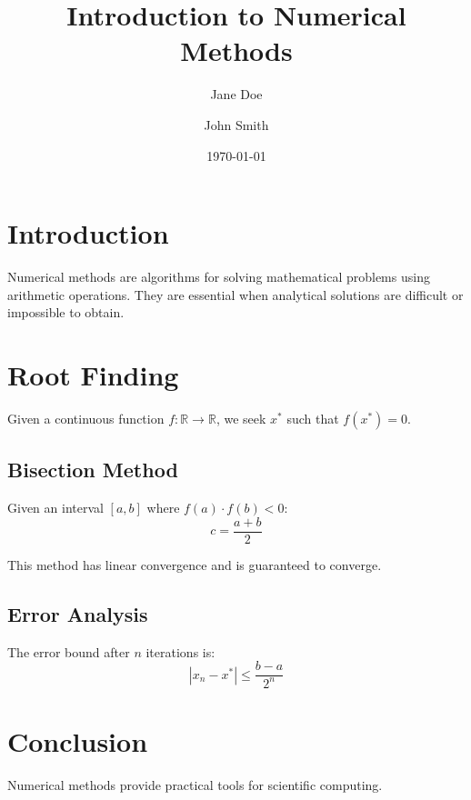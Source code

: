\documentclass[12pt,a4paper]{article}
\title{Introduction to Numerical Methods}
\author{Jane Doe \and John Smith}
\date{\today}
\begin{document}
\maketitle
\tableofcontents

\section{Introduction}
Numerical methods are algorithms for solving mathematical problems
using arithmetic operations. They are essential when analytical
solutions are difficult or impossible to obtain.

\section{Root Finding}
Given a continuous function $f: \mathbb{R} \rightarrow \mathbb{R}$,
we seek $x^*$ such that $f(x^*) = 0$.

\subsection{Bisection Method}
Given an interval $[a, b]$ where $f(a) \cdot f(b) < 0$:
\begin{equation}
  c = \frac{a + b}{2}
\end{equation}

This method has linear convergence and is guaranteed to converge.

\subsection{Error Analysis}
The error bound after $n$ iterations is:
\begin{equation}
  |x_n - x^*| \leq \frac{b - a}{2^n}
\end{equation}

\section{Conclusion}
Numerical methods provide practical tools for scientific computing.
\end{document}
